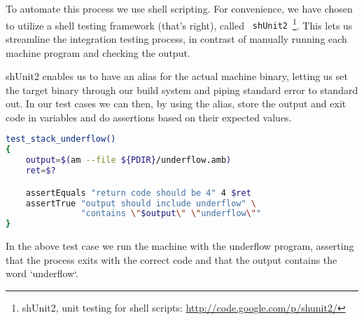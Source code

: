 To automate this process we use shell scripting. For convenience, we have chosen
to utilize a shell testing framework (that's right), called {\tt
  shUnit2}~\footnote{shUnit2, unit testing for shell scripts:
  \url{http://code.google.com/p/shunit2/}}. This lets us streamline the
integration testing process, in contrast of manually running each machine
program and checking the output.

shUnit2 enables us to have an alias for the actual machine binary, letting us
set the target binary through our build system and piping standard error to
standard out. In our test cases we can then, by using the alias, store the
output and exit code in variables and do assertions based on their expected
values.
\begin{lstlisting}[language={sh},caption={shUnit2 underflow test case}]
test_stack_underflow()
{
    output=$(am --file ${PDIR}/underflow.amb)
    ret=$?

    assertEquals "return code should be 4" 4 $ret
    assertTrue "output should include underflow" \
               "contains \"$output\" \"underflow\""
}
\end{lstlisting}

In the above test case we run the machine with the underflow program, asserting
that the process exits with the correct code and that the output contains the
word `underflow`.
